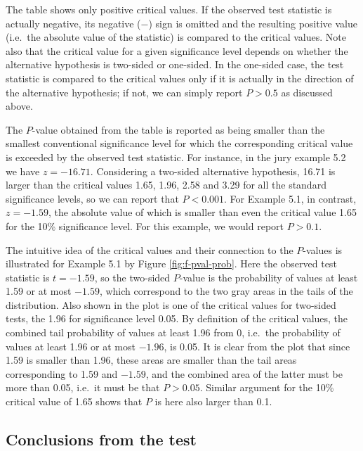 \documentclass[11pt,a4paper,openany]{book}
\begin{document}
The table shows only positive critical values. If the observed test
statistic is actually negative, its negative (\(-\)) sign is omitted and
the resulting positive value (i.e.~the absolute value of the statistic)
is compared to the critical values. Note also that the critical value
for a given significance level depends on whether the alternative
hypothesis is two-sided or one-sided. In the one-sided case, the test
statistic is compared to the critical values only if it is actually in
the direction of the alternative hypothesis; if not, we can simply
report \(P>0.5\) as discussed above.

The \(P\)-value obtained from the table is reported as being smaller
than the smallest conventional significance level for which the
corresponding critical value is exceeded by the observed test statistic.
For instance, in the jury example 5.2 we have \(z=-16.71\). Considering
a two-sided alternative hypothesis, 16.71 is larger than the critical
values 1.65, 1.96, 2.58 and 3.29 for all the standard significance
levels, so we can report that \(P<0.001\). For Example 5.1, in contrast,
\(z=-1.59\), the absolute value of which is smaller than even the
critical value 1.65 for the 10\% significance level. For this example,
we would report \(P>0.1\).

The intuitive idea of the critical values and their connection to the
\(P\)-values is illustrated for Example 5.1 by Figure
\ref{fig:f-pval-prob}. Here the observed test statistic is \(t=-1.59\),
so the two-sided \(P\)-value is the probability of values at least 1.59
or at most \(-1.59\), which correspond to the two gray areas in the
tails of the distribution. Also shown in the plot is one of the critical
values for two-sided tests, the 1.96 for significance level 0.05. By
definition of the critical values, the combined tail probability of
values at least 1.96 from 0, i.e.~the probability of values at least
1.96 or at most \(-1.96\), is 0.05. It is clear from the plot that since
1.59 is smaller than 1.96, these areas are smaller than the tail areas
corresponding to 1.59 and \(-1.59\), and the combined area of the latter
must be more than 0.05, i.e.~it must be that \(P>0.05\). Similar
argument for the 10\% critical value of 1.65 shows that \(P\) is here
also larger than 0.1.

\subsection{Conclusions from the
test}\label{ss-probs-test1sample-conclusions}
\end{document}
